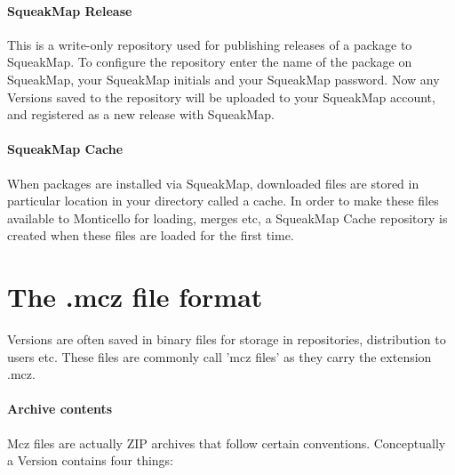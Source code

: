 \documentclass[a4paper,10pt,twoside]{book}
\begin{document}
\paragraph{SqueakMap Release} This is a write-only repository used for publishing releases of a package to SqueakMap. To configure the repository enter the name of the package on SqueakMap, your SqueakMap initials and your SqueakMap password. Now any Versions saved to the repository will be uploaded to your SqueakMap account, and registered as a new release with SqueakMap.

\paragraph{SqueakMap Cache} When packages are installed via SqueakMap, downloaded files are stored in particular location in your directory called a cache. In order to make these files available to Monticello for loading, merges etc, a SqueakMap Cache repository is created when these files are loaded for the first time.



\section{The .mcz file format}

Versions are often saved in binary files for storage in repositories, distribution to users etc. These files are commonly call 'mcz files' as they carry the extension .mcz.

\paragraph{Archive contents}

Mcz files are actually ZIP archives that follow certain conventions. Conceptually a Version contains four things:
\end{document}
